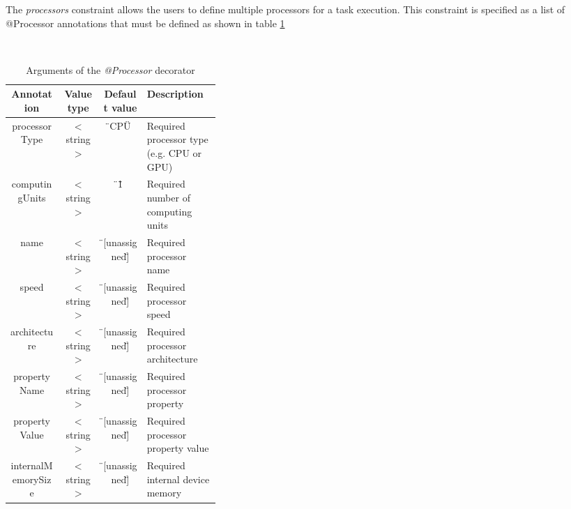 The \textit{processors} constraint allows the users to define multiple processors for a task execution. This constraint is specified
as a list of @Processor annotations that must be defined as shown in table \ref{tab:processor_constraint}

~ \newline

\bgroup
  \def\arraystretch{1.4}%
  \begin{table}[!ht]
  \centering
  \begin{tabular}{ | c | c | c | p{0.35\linewidth} | }
  \hline
  \textbf{Annotation} 	& \textbf{Value type}	& \textbf{Default value}& \textbf{Description} \\ \hline
  processorType		& $<$string$>$ 		& \"{}CPU\"	 	& Required processor type (e.g. CPU or GPU)\\ \hline
  computingUnits 	& $<$string$>$ 		& \"{}1\" 		& Required number of computing units \\ \hline
  name 			& $<$string$>$ 		& \"{}[unassigned]\" 	& Required processor name \\ \hline
  speed 		& $<$string$>$ 		& \"{}[unassigned]\" 	& Required processor speed \\ \hline
  architecture 		& $<$string$>$ 		& \"{}[unassigned]\" 	& Required processor architecture \\ \hline
  propertyName		& $<$string$>$ 		& \"{}[unassigned]\" 	& Required processor property \\ \hline
  propertyValue		& $<$string$>$ 		& \"{}[unassigned]\" 	& Required processor property value \\ \hline
  internalMemorySize 	& $<$string$>$ 		& \"{}[unassigned]\" 	& Required internal device memory \\ \hline
  \end{tabular}
  \caption{Arguments of the \textit{@Processor} decorator}
  \label{tab:processor_constraint}
  \end{table}
\egroup